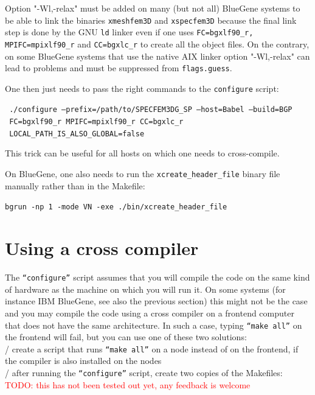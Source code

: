 \documentclass[oneside,english]{book}
\newcommand{\red}[1]{\textcolor{Red}{#1}}
\begin{document}
\noindent
Option "-Wl,-relax" must be added on many (but not all) BlueGene systems to be able to link the binaries \texttt{xmeshfem3D}
and \texttt{xspecfem3D} because the final link step is done by the GNU \texttt{ld} linker even if
one uses \texttt{FC=bgxlf90\_r, MPIFC=mpixlf90\_r} and \texttt{CC=bgxlc\_r} to create all the object files.
On the contrary, on some BlueGene systems that use the native AIX linker option "-Wl,-relax" can lead to problems and must be suppressed from \texttt{flags.guess}.

\noindent
One then just needs to pass the right commands to the \texttt{configure} script:

\noindent
\texttt{   ./configure --prefix=/path/to/SPECFEM3DG\_SP --host=Babel --build=BGP \\}
\texttt{      FC=bgxlf90\_r MPIFC=mpixlf90\_r CC=bgxlc\_r  \\}
\texttt{      LOCAL\_PATH\_IS\_ALSO\_GLOBAL=false}

\noindent
This trick can be useful for all hosts on which one needs to cross-compile.

\noindent
On BlueGene, one also needs to run the \texttt{xcreate\_header\_file} binary file manually rather than in the Makefile:

\noindent
   \texttt{bgrun -np 1 -mode VN -exe ./bin/xcreate\_header\_file}

\section{Using a cross compiler}

The \texttt{``configure''} script assumes that you will compile the code on the same kind of hardware
as the machine on which you will run it. On some systems (for instance IBM BlueGene, see also the previous section) this might not be the case
and you may compile the code using a cross compiler on a frontend computer that does not have the same
architecture. In such a case, typing \texttt{``make all''} on the frontend will fail, but you can use one of these two solutions: \\

/ create a script that runs \texttt{``make all''} on a node instead of on the frontend, if the compiler is also installed on the nodes \\

/ after running the \texttt{``configure''} script, create two copies of the Makefiles:
\\
\red{TODO: this has not been tested out yet, any feedback is welcome}
\\
\end{document}
